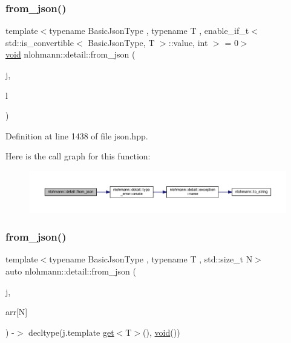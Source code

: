 \subsubsection{\texorpdfstring{from\_json()}{from\_json()}\hspace{0.1cm}{\footnotesize\ttfamily [10/18]}}
{\footnotesize\ttfamily template$<$typename Basic\+Json\+Type , typename T , enable\+\_\+if\+\_\+t$<$ std\+::is\+\_\+convertible$<$ Basic\+Json\+Type, T $>$\+::value, int $>$  = 0$>$ \\
\mbox{\hyperlink{namespacenlohmann_1_1detail_a59fca69799f6b9e366710cb9043aa77d}{void}} nlohmann\+::detail\+::from\+\_\+json (\begin{DoxyParamCaption}\item[{const Basic\+Json\+Type \&}]{j,  }\item[{std\+::valarray$<$ T $>$ \&}]{l }\end{DoxyParamCaption})}



Definition at line 1438 of file json.\+hpp.

Here is the call graph for this function\+:
\nopagebreak
\begin{figure}[H]
\begin{center}
\leavevmode
\includegraphics[width=350pt]{namespacenlohmann_1_1detail_a3df497b1d3977f071b488ecac1401517_cgraph}
\end{center}
\end{figure}
\mbox{\label{namespacenlohmann_1_1detail_a7deb2db8eed6f1762373dde7a6595760}} 
\subsubsection{\texorpdfstring{from\_json()}{from\_json()}\hspace{0.1cm}{\footnotesize\ttfamily [11/18]}}
{\footnotesize\ttfamily template$<$typename Basic\+Json\+Type , typename T , std\+::size\+\_\+t N$>$ \\
auto nlohmann\+::detail\+::from\+\_\+json (\begin{DoxyParamCaption}\item[{const Basic\+Json\+Type \&}]{j,  }\item[{T(\&)}]{arr\mbox{[}\+N\mbox{]} }\end{DoxyParamCaption}) -\/$>$ decltype(j.\+template \mbox{\hyperlink{namespacenlohmann_1_1detail_acc422c11342b31368f610b6f96fcedc6}{get}}$<$T$>$(), \mbox{\hyperlink{namespacenlohmann_1_1detail_a59fca69799f6b9e366710cb9043aa77d}{void}}())
}



